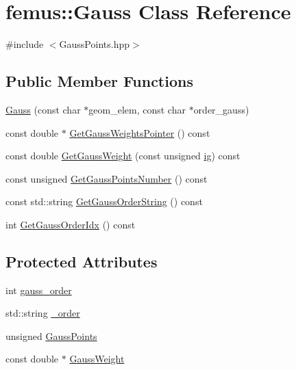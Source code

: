 \hypertarget{classfemus_1_1_gauss}{}\section{femus\+:\+:Gauss Class Reference}
\label{classfemus_1_1_gauss}


{\ttfamily \#include $<$Gauss\+Points.\+hpp$>$}

\subsection*{Public Member Functions}
\begin{DoxyCompactItemize}
\item 
\mbox{\hyperlink{classfemus_1_1_gauss_a0b6754a04d9ecbeb30bc23ed136d2a4a}{Gauss}} (const char $\ast$geom\+\_\+elem, const char $\ast$order\+\_\+gauss)
\item 
const double $\ast$ \mbox{\hyperlink{classfemus_1_1_gauss_a610f996a146a03b76031e86810c883f3}{Get\+Gauss\+Weights\+Pointer}} () const
\item 
const double \mbox{\hyperlink{classfemus_1_1_gauss_a9aed14f6d02b6aad6b6eb59db1001438}{Get\+Gauss\+Weight}} (const unsigned \mbox{\hyperlink{namespacefemus_a6df31099f676311de214a312d7043941}{ig}}) const
\item 
const unsigned \mbox{\hyperlink{classfemus_1_1_gauss_ab1eb96997b69ce4ebec7283eb3bf1c01}{Get\+Gauss\+Points\+Number}} () const
\item 
const std\+::string \mbox{\hyperlink{classfemus_1_1_gauss_a8b30f3ee234af8b2950fefd7b0927610}{Get\+Gauss\+Order\+String}} () const
\item 
int \mbox{\hyperlink{classfemus_1_1_gauss_a8dfd801f0e3ed2b6e521126c68f4e92a}{Get\+Gauss\+Order\+Idx}} () const
\end{DoxyCompactItemize}
\subsection*{Protected Attributes}
\begin{DoxyCompactItemize}
\item 
int \mbox{\hyperlink{classfemus_1_1_gauss_a72aa5f24a5eb3ef6aecca364729ed7d2}{gauss\+\_\+order}}
\item 
std\+::string \mbox{\hyperlink{classfemus_1_1_gauss_a2cbe7db6acef1220f7fc3217a70652b1}{\+\_\+order}}
\item 
unsigned \mbox{\hyperlink{classfemus_1_1_gauss_a8d4e2ad6aa8ac6a50f6d69602c08ce33}{Gauss\+Points}}
\item 
const double $\ast$ \mbox{\hyperlink{classfemus_1_1_gauss_a4ab18651d7e5a95c4c724be7eeb114eb}{Gauss\+Weight}}
\end{DoxyCompactItemize}


